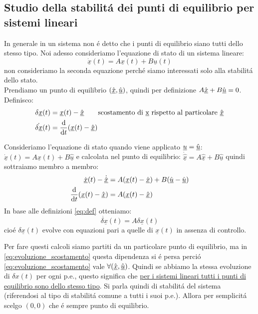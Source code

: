 \documentclass[../main.tex]{subfiles}
\begin{document}
	\subsection{Studio della stabilit\'a dei punti di equilibrio per sistemi lineari}
		In generale in un sistema non \'e detto che i punti di equilibrio siano tutti dello stesso tipo.
		Noi adesso consideriamo l'equazione di stato di un sistema lineare:
		\[ \dot{\underline{x}}(t) = A \underline x(t) + B\underline u(t) \]
		non consideriamo la seconda equazione perch\'e siamo interessati solo alla stabilit\'a dello stato.\\
		Prendiamo un punto di equilibrio $ (\hat{\underline x}, \hat{\underline u}) $, quindi per definizione $ A \hat{\underline x} + B \hat{\underline u} = 0 $. Definisco:
		\begin{align}
			\delta \underline x(t) &= \underline x(t) - \hat{\underline x} \qquad \text{scostamento di \underline x rispetto al particolare}\ \hat{\underline x}\\
			\dot{\delta \underline x}(t) &= \frac{\mathrm{d} }{\mathrm{d} t} (\underline x(t) - \hat{\underline x})
			\label{eq:def}
		\end{align}
		
		Consideriamo l'equazione di stato quando viene applicato $ \underline u = \hat{\underline u} $: $ \dot{\underline{x}}(t) = A \underline x(t) + B\underline{\hat u} $ e calcolata nel punto di equilibrio: $ \dot{\hat{\underline{x}}} = A \underline{\hat x} + B\underline{\hat u} $ quindi sottraiamo membro a membro:
		\begin{align*}
			\dot{\underline{x}}(t) - \dot{\hat{\underline x}} &= A (\underline x(t) - \hat{\underline x}) + B(\hat{\underline u} - \hat{\underline u})\\
			\frac{\mathrm{d} }{\mathrm{d} t} (\underline x(t) - \hat{\underline x}) &= A (\underline x(t) - \hat{\underline x})
		\end{align*}
		In base alle definizioni \ref{eq:def} otteniamo:
		\begin{equation}
			\dot{\delta \underline x}(t) = A \delta \underline x(t)
			\label{eq:evoluzione_scostamento}
		\end{equation}
		cio\'e $ \delta \underline x(t) $ evolve con equazioni pari a quelle di $ \underline x(t) $ in assenza di controllo.
		
		Per fare questi calcoli siamo partiti da un particolare punto di equilibrio, ma in \ref{eq:evoluzione_scostamento} questa dipendenza si \'e persa perci\'o \ref{eq:evoluzione_scostamento} vale $ \forall (\hat{\underline x}, \hat{\underline u}) $. Quindi se abbiamo la stessa evoluzione di $ \delta x(t) $ per ogni p.e., questo significa che \underline{per i sistemi lineari tutti i punti di equilibrio sono dello stesso tipo}. Si parla quindi di stabilit\'a del sistema (riferendosi al tipo di stabilit\'a comune a tutti i suoi p.e.). Allora per semplicit\'a scelgo $ (0,0) $ che \'e sempre punto di equilibrio. 
		
\end{document}
